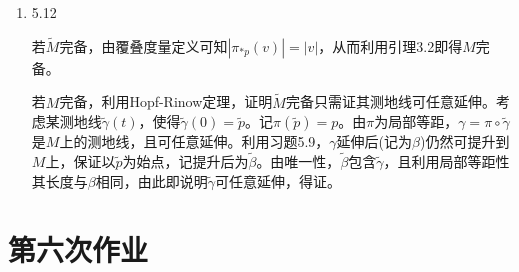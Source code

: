 \documentclass[a4paper,UTF8,fontset=windows,10pt]{ctexart}
\begin{document}
\begin{enumerate}
    \item 5.12
    
    若$\tilde{M}$完备，由覆叠度量定义可知$|\pi_{*p}(v)|=|v|$，从而利用引理3.2即得$M$完备。
    
    若$M$完备，利用Hopf-Rinow定理，证明$\tilde{M}$完备只需证其测地线可任意延伸。考虑某测地线$\tilde{\gamma}(t)$，使得$\tilde{\gamma}(0)=\tilde{p}$。记$\pi(\tilde{p})=p$。由$\pi$为局部等距，$\gamma=\pi\circ\tilde\gamma$是$M$上的测地线，且可任意延伸。利用习题5.9，$\gamma$延伸后(记为$\beta$)仍然可提升到$M$上，保证以$\tilde{p}$为始点，记提升后为$\tilde\beta$。由唯一性，$\tilde\beta$包含$\tilde\gamma$，且利用局部等距性其长度与$\beta$相同，由此即说明$\tilde\gamma$可任意延伸，得证。
\end{enumerate}

\section{第六次作业}
\end{document}
